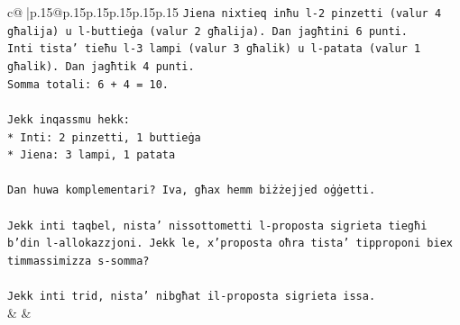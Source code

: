 \documentclass{article}
\begin{document}
{\begin{supertabular}{c@{$\;$}|p{.15\linewidth}@{}p{.15\linewidth}p{.15\linewidth}p{.15\linewidth}p{.15\linewidth}p{.15\linewidth}}
{{{\texttt{Jiena nixtieq inħu l{-}2 pinzetti (valur 4 għalija) u l{-}buttieġa (valur 2 għalija). Dan jagħtini 6 punti.} \\
\texttt{Inti tista' tieħu l{-}3 lampi (valur 3 għalik) u l{-}patata (valur 1 għalik). Dan jagħtik 4 punti.} \\
\texttt{Somma totali: 6 + 4 = 10.} \\
\\ 
\texttt{Jekk inqassmu hekk:} \\
\texttt{*   Inti: 2 pinzetti, 1 buttieġa} \\
\texttt{*   Jiena: 3 lampi, 1 patata} \\
\\ 
\texttt{Dan huwa komplementari? Iva, għax hemm biżżejjed oġġetti.} \\
\\ 
\texttt{Jekk inti taqbel, nista' nissottometti l{-}proposta sigrieta tiegħi b'din l{-}allokazzjoni. Jekk le, x'proposta oħra tista' tipproponi biex timmassimizza s{-}somma?} \\
\\ 
\texttt{Jekk inti trid, nista' nibgħat il{-}proposta sigrieta issa.} \\
            }
        }
    }
    & & \\ \\


\end{supertabular}}
\end{document}
